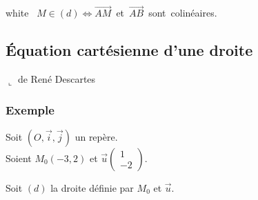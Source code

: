 \begin{itemize}
\begin{center}
\end{center}

\vspace{.5cm}

\begin{center}
      {white}{
     \hbox{
       $M\in(d)\Longleftrightarrow\overrightarrow{AM}$ 
           et $\overrightarrow{AB}$ sont colinéaires.}}
\end{center}

\end{itemize}

\newpage 


\subsection{Équation cartésienne d'une droite}
\vspace{-.4cm}\hspace{3cm}$\llcorner$ {\footnotesize de René Descartes}

\subsubsection{Exemple }
Soit $(O, \vec{i}, \vec{j})$ un repère. \\
Soient $M_{0}(-3,2) $ et $\vec{u}\left(\begin{array}{c}
                                    1\\
                                    -2
                               \end{array}\right)$.
                 
Soit $(d)$ la droite définie par $M_{0}$ et $\vec{u}$.

